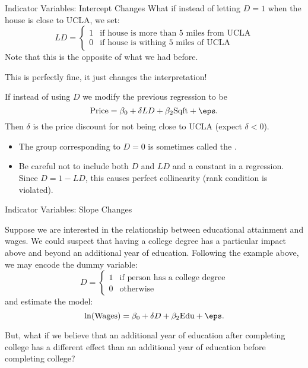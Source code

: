 \documentclass[notheorems, 9pt, handout]{beamer}
\begin{document}
\begin{frame}{Indicator Variables: Intercept Changes} %
	 What if instead of letting \(D=1\) when the house is close to UCLA, we set:
	 \[
	    LD = \begin{cases}
	    	1 & \text{if house is more than 5 miles from UCLA} \\
			0 & \text{if house is withing 5 miles of UCLA}
	    \end{cases}
	\] 
	Note that this is the opposite of what we had before.
	
	 This is perfectly fine, it just changes the interpretation!
	\onslide<2->
	\begin{example*}
		If instead of using \(D\) we modify the previous regression to be
		\[
			\text{Price} = \beta_0 + \delta LD + \beta_2\text{Sqft} + \eps
		.\] 
		Then \(\delta\) is the price discount for not being close to UCLA (expect \(\delta < 0\)).
	\end{example*}
	
	\begin{itemize}
		\item The group corresponding to \(D=0\) is sometimes called the . 
		\item Be careful not to include both \(D\) and  \(LD\) and a constant in a regression. Since  \(D = 1 - LD\), this causes perfect collinearity (rank condition is violated).
	\end{itemize}
\end{frame}
\begin{frame}{Indicator Variables: Slope Changes} %
	\label{frame:slope-changes} %
	\begin{example*}
		Suppose we are interested in the relationship between educational attainment and wages. We could suspect that having a college degree has a particular impact above and beyond an additional year of education. Following the example above, we may encode the dummy variable:
		\[
		    D = \begin{cases}
		    	1 & \text{if person has a college degree} \\
				0 & \text{otherwise}
		    \end{cases}
		\] 
		and estimate the model:
		\[
			\ln(\text{Wages}) = \beta_0 + \delta D + \beta_2\text{Edu} + \eps
		.\] 
	\end{example*}
	 But, what if we believe that an additional year of education after completing college has a different effect than an additional year of education before completing college?
\end{frame}
\end{document}

